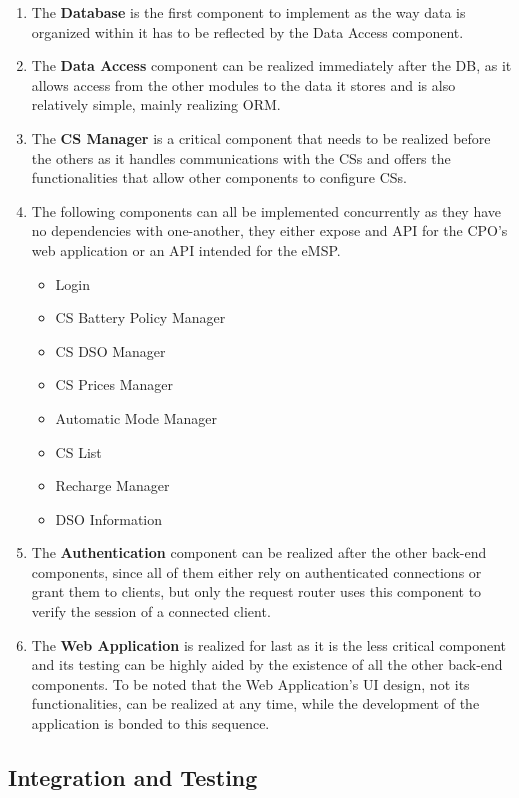 \documentclass[11pt]{article}
\begin{document}
\begin{enumerate}
    \item The \textbf{Database} is the first component to implement as the way data is organized within it has to be reflected by the Data Access component.
    \item The \textbf{Data Access} component can be realized immediately after the DB, as it allows access from the other modules to the data it stores and is also relatively simple, mainly realizing ORM.
    \item The \textbf{CS Manager} is a critical component that needs to be realized before the others as it handles communications with the CSs and offers the functionalities that allow other components to configure CSs.
    \item The following components can all be implemented concurrently as they have no dependencies with one-another, they either expose and API for the CPO's web application or an API intended for the eMSP. 
    \begin{itemize}
        \item Login
        \item CS Battery Policy Manager
        \item CS DSO Manager
        \item CS Prices Manager
        \item Automatic Mode Manager
        \item CS List
        \item Recharge Manager
        \item DSO Information
    \end{itemize}
    \item The \textbf{Authentication} component can be realized after the other back-end components, since all of them either rely on authenticated connections or grant them to clients, but only the request router uses this component to verify the session of a connected client.
    \item The \textbf{Web Application} is realized for last as it is the less critical component and its testing can be highly aided by the existence of all the other back-end components. To be noted that the Web Application's UI design, not its functionalities, can be realized at any time, while the development of the application is bonded to this sequence.
\end{enumerate}

\subsection{Integration and Testing}
\end{document}
